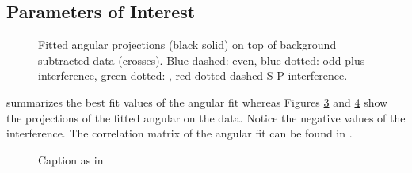 \subsection{Parameters of Interest}
\label{Parameters_of_Interest}

\begin{figure}[!t]
  \begin{subfigure}{\textwidth}
    \centering
    \scalebox{1.45}{}
    \label{angPlot_ctk}
  \end{subfigure}
  \begin{subfigure}{\textwidth}
    \centering
    \scalebox{1.45}{}
    \label{angPlot_ctl}
  \end{subfigure}
    \caption{Fitted angular \pdf projections (black solid) on top of \BsJpsiKst background subtracted data (crosses).
           Blue dashed: \pwave even, blue dotted: \pwave odd plus interference,
           green dotted: \swave, red dotted dashed S-P interference.}
  \label{angular_plot_thetas}
\end{figure}

 summarizes the best fit values of the angular fit whereas
Figures \ref{angular_plot_thetas} and \ref{angPlot_phi} show the projections of the fitted angular \pdf on the data.
Notice the negative values of the \spwave interference. The correlation matrix of the
angular fit can be found in .

\begin{figure}[!t]
    \centering
    \scalebox{1.45}{}
    \caption{Caption as in }
    \label{angPlot_phi}
\end{figure}


